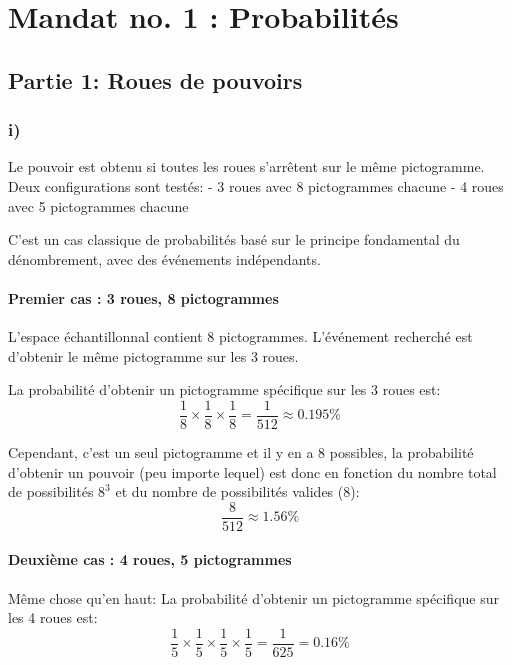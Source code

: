 
    \section{Mandat no. 1 :
Probabilités}\label{mandat-no.-1-probabilituxe9s}

    \subsection{Partie 1: Roues de
pouvoirs}\label{partie-1-roues-de-pouvoirs}

    \subsubsection{i)}\label{i}

Le pouvoir est obtenu si toutes les roues s'arrêtent sur le même
pictogramme. Deux configurations sont testés: - 3 roues avec 8
pictogrammes chacune - 4 roues avec 5 pictogrammes chacune

C'est un cas classique de probabilités basé sur le principe fondamental
du dénombrement, avec des événements indépendants.

\paragraph{Premier cas : 3 roues, 8
pictogrammes}\label{premier-cas-3-roues-8-pictogrammes}

L'espace échantillonnal contient 8 pictogrammes. L'événement recherché
est d'obtenir le même pictogramme sur les 3 roues.

La probabilité d'obtenir un pictogramme spécifique sur les 3 roues est:
\[
\frac{1}{8} \times \frac{1}{8} \times \frac{1}{8} = \frac{1}{512} \approx 0.195\%
\]

Cependant, c'est un seul pictogramme et il y en a 8 possibles, la
probabilité d'obtenir un pouvoir (peu importe lequel) est donc en
fonction du nombre total de possibilités \(8^3\) et du nombre de
possibilités valides (\(8\)): \[
\frac{8}{512} \approx 1.56\%
\]

\paragraph{Deuxième cas : 4 roues, 5
pictogrammes}\label{deuxiuxe8me-cas-4-roues-5-pictogrammes}

Même chose qu'en haut: La probabilité d'obtenir un pictogramme
spécifique sur les 4 roues est: \[
\frac{1}{5} \times \frac{1}{5} \times \frac{1}{5} \times \frac{1}{5} = \frac{1}{625} = 0.16\%
\]

